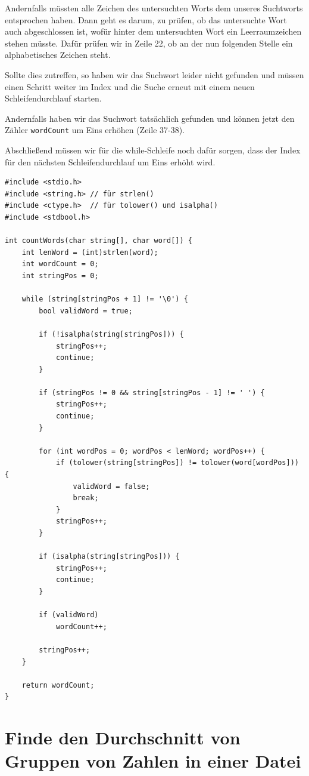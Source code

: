 Andernfalls müssten alle Zeichen des untersuchten Worts dem unseres Suchtworts
entsprochen haben. Dann geht es darum, zu prüfen, ob das untersuchte Wort auch
abgeschlossen ist, wofür hinter dem untersuchten Wort ein Leerraumzeichen stehen
müsste. Dafür prüfen wir in Zeile 22, ob an der nun folgenden Stelle ein
alphabetisches Zeichen steht.

Sollte dies zutreffen, so haben wir das Suchwort leider nicht gefunden und
müssen einen Schritt weiter im Index und die Suche erneut mit einem neuen
Schleifendurchlauf starten.

Andernfalls haben wir das Suchwort tatsächlich gefunden und können jetzt den
Zähler \texttt{wordCount} um Eins erhöhen (Zeile 37-38).

Abschließend müssen wir für die while-Schleife noch dafür sorgen, dass der Index
für den nächsten Schleifendurchlauf um Eins erhöht wird.

\begin{verbatim}
#include <stdio.h>
#include <string.h> // für strlen()
#include <ctype.h>  // für tolower() und isalpha()
#include <stdbool.h>

int countWords(char string[], char word[]) {
    int lenWord = (int)strlen(word);
    int wordCount = 0;
    int stringPos = 0;

    while (string[stringPos + 1] != '\0') {
        bool validWord = true;

        if (!isalpha(string[stringPos])) {
            stringPos++;
            continue;
        }

        if (stringPos != 0 && string[stringPos - 1] != ' ') {
            stringPos++;
            continue;
        }

        for (int wordPos = 0; wordPos < lenWord; wordPos++) {
            if (tolower(string[stringPos]) != tolower(word[wordPos])) {
                validWord = false;
                break;
            }
            stringPos++;
        }

        if (isalpha(string[stringPos])) {
            stringPos++;
            continue;
        }

        if (validWord)
            wordCount++;

        stringPos++;
    }

    return wordCount;
}
\end{verbatim}






\chapter{Finde den Durchschnitt von Gruppen von Zahlen in einer Datei}

